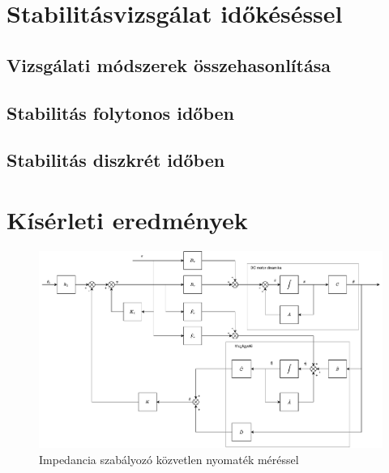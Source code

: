 \chapter{Stabilitásvizsgálat időkéséssel}\label{chap:time_delay_stability}

\section{Vizsgálati módszerek összehasonlítása}

\section{Stabilitás folytonos időben}

\section{Stabilitás diszkrét időben}

\chapter{Kísérleti eredmények}\label{chap:experimental_results}

\begin{figure}[ht]
\begin{center}
\includegraphics[width=\textwidth]{images/compensated_position_control_torque.drawio.pdf}
\caption{Impedancia szabályozó közvetlen nyomaték méréssel}
\end{center}
\end{figure}


